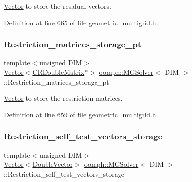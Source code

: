 \hyperlink{classoomph_1_1Vector}{Vector} to store the residual vectors. 



Definition at line 665 of file geometric\+\_\+multigrid.\+h.

\mbox{\label{classoomph_1_1MGSolver_a8a4974aac58e9835089da9b4b8039952}} 
\subsubsection{\texorpdfstring{Restriction\+\_\+matrices\+\_\+storage\+\_\+pt}{Restriction\_matrices\_storage\_pt}}
{\footnotesize\ttfamily template$<$unsigned D\+IM$>$ \\
\hyperlink{classoomph_1_1Vector}{Vector}$<$\hyperlink{classoomph_1_1CRDoubleMatrix}{C\+R\+Double\+Matrix}$\ast$$>$ \hyperlink{classoomph_1_1MGSolver}{oomph\+::\+M\+G\+Solver}$<$ D\+IM $>$\+::Restriction\+\_\+matrices\+\_\+storage\+\_\+pt\hspace{0.3cm}{\ttfamily [private]}}



\hyperlink{classoomph_1_1Vector}{Vector} to store the restriction matrices. 



Definition at line 659 of file geometric\+\_\+multigrid.\+h.

\mbox{\label{classoomph_1_1MGSolver_a79fd640c7e43f08dca60f41d3ff91d59}} 
\subsubsection{\texorpdfstring{Restriction\+\_\+self\+\_\+test\+\_\+vectors\+\_\+storage}{Restriction\_self\_test\_vectors\_storage}}
{\footnotesize\ttfamily template$<$unsigned D\+IM$>$ \\
\hyperlink{classoomph_1_1Vector}{Vector}$<$\hyperlink{classoomph_1_1DoubleVector}{Double\+Vector}$>$ \hyperlink{classoomph_1_1MGSolver}{oomph\+::\+M\+G\+Solver}$<$ D\+IM $>$\+::Restriction\+\_\+self\+\_\+test\+\_\+vectors\+\_\+storage\hspace{0.3cm}{\ttfamily [private]}}



